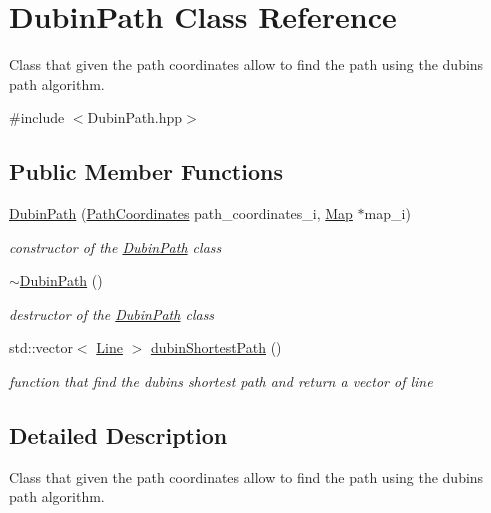 \hypertarget{class_dubin_path}{}\section{Dubin\+Path Class Reference}
\label{class_dubin_path}


Class that given the path coordinates allow to find the path using the dubins path algorithm.  




{\ttfamily \#include $<$Dubin\+Path.\+hpp$>$}

\subsection*{Public Member Functions}
\begin{DoxyCompactItemize}
\item 
\mbox{\hyperlink{class_dubin_path_a2acdccca5f08b09708ea41b21d2b7e04}{Dubin\+Path}} (\mbox{\hyperlink{class_path_coordinates}{Path\+Coordinates}} path\+\_\+coordinates\+\_\+i, \mbox{\hyperlink{class_map}{Map}} $\ast$map\+\_\+i)
\begin{DoxyCompactList}\small\item\em constructor of the \mbox{\hyperlink{class_dubin_path}{Dubin\+Path}} class \end{DoxyCompactList}\item 
\mbox{\label{class_dubin_path_a89b962b8ff3bf5cbb9fda6d539bb7a9c}} 
\mbox{\hyperlink{class_dubin_path_a89b962b8ff3bf5cbb9fda6d539bb7a9c}{$\sim$\+Dubin\+Path}} ()
\begin{DoxyCompactList}\small\item\em destructor of the \mbox{\hyperlink{class_dubin_path}{Dubin\+Path}} class \end{DoxyCompactList}\item 
std\+::vector$<$ \mbox{\hyperlink{class_line}{Line}} $>$ \mbox{\hyperlink{class_dubin_path_a260513ceab4e25a5a8867ea2701fbb68}{dubin\+Shortest\+Path}} ()
\begin{DoxyCompactList}\small\item\em function that find the dubins shortest path and return a vector of line \end{DoxyCompactList}\end{DoxyCompactItemize}


\subsection{Detailed Description}
Class that given the path coordinates allow to find the path using the dubins path algorithm. 

